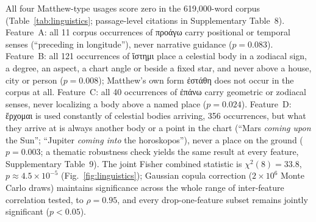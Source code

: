 \documentclass[sn-nature]{sn-jnl}
\newcommand{\grk}[1]{{\fontencoding{LGR}\selectfont #1}}
\newcommand{\grk}[1]{{\greekfont #1}}
\begin{document}
All four Matthew-type usages score zero in the 619,000-word corpus
(Table~\ref{tab:linguistics}; passage-level citations in Supplementary
Table~8). Feature~A: all 11 corpus occurrences of \grk{προάγω} carry
positional or temporal senses (``preceding in longitude''), never narrative
guidance ($p = 0.083$). Feature~B: all 121 occurrences of \grk{ἵστημι} place
a celestial body in a zodiacal sign, a degree, an aspect, a chart angle or
beside a fixed star, and never above a house, city or person ($p = 0.008$);
Matthew's own form \grk{ἐστάθη} does not occur in the corpus at all.
Feature~C: all 40 occurrences of \grk{ἐπάνω}
carry geometric or zodiacal senses, never localizing a body above a named
place ($p = 0.024$). Feature~D: \grk{ἔρχομαι} is used constantly of celestial
bodies arriving, 356 occurrences, but what they arrive at is always another
body or a point in the chart (``Mars \emph{coming upon} the Sun''; ``Jupiter
\emph{coming into} the horoskopos''), never a place on the ground
($p = 0.003$; a thematic robustness check yields the same result at every
feature, Supplementary Table~9). The joint Fisher combined
statistic is $\chi^2(8)=33.8$, $p \approx 4.5\times10^{-5}$
(Fig.~\ref{fig:linguistics}); Gaussian copula correction
($2\times10^6$ Monte Carlo draws) maintains significance across the whole
range of inter-feature correlation tested, to $\rho = 0.95$, and every
drop-one-feature subset remains jointly significant ($p < 0.05$).
\end{document}
